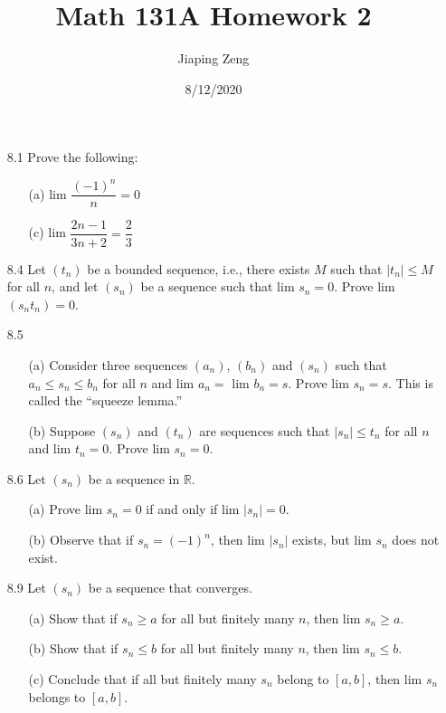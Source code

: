 \documentclass{article}
\title{Math 131A Homework 2}
\date{8/12/2020}
\author{Jiaping Zeng}
\begin{document}
\maketitle

\begin{itemize}
    \item [8.1] Prove the following:
          \begin{itemize}
              \item [(a)] lim $\dfrac{(-1)^n}{n}=0$
              \item [(c)] lim $\dfrac{2n-1}{3n+2}=\dfrac{2}{3}$
          \end{itemize}
    \item [8.4] Let $(t_n)$ be a bounded sequence, i.e., there exists $M$ such that $|t_n|\leq M$ for all $n$, and let $(s_n)$ be a sequence such that lim $s_n=0$. Prove lim $(s_nt_n)=0$.
    \item [8.5]
          \begin{itemize}
              \item [(a)] Consider three sequences $(a_n)$, $(b_n)$ and $(s_n)$ such that $a_n\leq s_n\leq b_n$ for all $n$ and lim $a_n=$ lim $b_n=s$. Prove lim $s_n=s$. This is called the ``squeeze lemma.''
              \item [(b)] Suppose $(s_n)$ and $(t_n)$ are sequences such that $|s_n|\leq t_n$ for all $n$ and lim $t_n=0$. Prove lim $s_n=0$.
          \end{itemize}
    \item [8.6] Let $(s_n)$ be a sequence in $\mathbb{R}$.
          \begin{itemize}
              \item [(a)] Prove lim $s_n=0$ if and only if lim $|s_n|=0$.
              \item [(b)] Observe that if $s_n=(-1)^n$, then lim $|s_n|$ exists, but lim $s_n$ does not exist.
          \end{itemize}
    \item [8.9] Let $(s_n)$ be a sequence that converges.
          \begin{itemize}
              \item [(a)] Show that if $s_n\geq a$ for all but finitely many $n$, then lim $s_n\geq a$.
              \item [(b)] Show that if $s_n\leq b$ for all but finitely many $n$, then lim $s_n\leq b$.
              \item [(c)] Conclude that if all but finitely many $s_n$ belong to $[a,b]$, then lim $s_n$ belongs to $[a,b]$.

\end{itemize}
\end{itemize}
\end{document}
